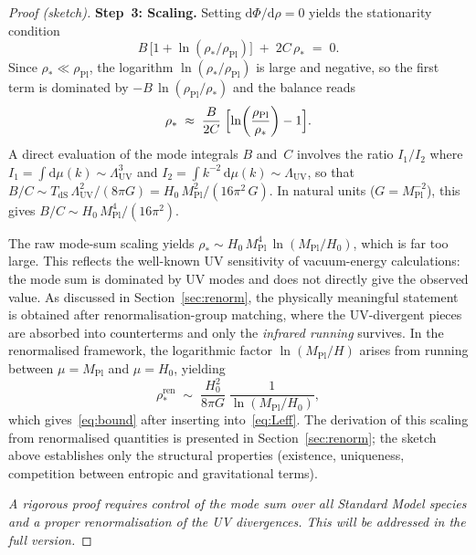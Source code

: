 \documentclass[12pt,a4paper]{article}
\theoremstyle{definition}
\theoremstyle{plain}
\theoremstyle{remark}
\newcommand{\LUV}{\Lambda_{\mathrm{UV}}}
\newcommand{\dd}{\mathrm{d}}
\begin{document}
\begin{proof}[Proof (sketch)]
\medskip\noindent
\textbf{Step~3: Scaling.}\;
Setting $\dd\Phi/\dd\rho = 0$ yields the stationarity condition
\begin{equation}\label{eq:stationarity}
  B\,\bigl[1 + \ln(\rho_{\ast}/\rho_{\mathrm{Pl}})\bigr]
  \;+\; 2C\,\rho_{\ast} \;=\; 0.
\end{equation}
Since $\rho_{\ast} \ll \rho_{\mathrm{Pl}}$, the logarithm
$\ln(\rho_{\ast}/\rho_{\mathrm{Pl}})$ is large and negative, so the
first term is dominated by $-B\,\ln(\rho_{\mathrm{Pl}}/\rho_{\ast})$
and the balance reads
\begin{equation}\label{eq:balance}
  \rho_{\ast} \;\approx\;
  \frac{B}{2C}\;\Bigl[\ln\!\left(\frac{\rho_{\mathrm{Pl}}}{\rho_{\ast}}\right)
  - 1\Bigr].
\end{equation}
A direct evaluation of the mode integrals $B$ and~$C$ involves the
ratio $I_{1}/I_{2}$ where $I_{1} = \int \dd\mu(k) \sim \LUV^{3}$ and
$I_{2} = \int k^{-2}\,\dd\mu(k) \sim \LUV$, so that
$B/C \sim T_{\mathrm{dS}}\,\LUV^{2}/(8\pi G)
= H_0\,M_{\mathrm{Pl}}^{2}/(16\pi^{2}\,G)$.
In natural units ($G = M_{\mathrm{Pl}}^{-2}$), this gives
$B/C \sim H_0\,M_{\mathrm{Pl}}^{4}/(16\pi^{2})$.

The raw mode-sum scaling yields $\rho_{\ast} \sim
H_0\,M_{\mathrm{Pl}}^{4}\,\ln(M_{\mathrm{Pl}}/H_0)$, which is far too
large.  This reflects the well-known UV sensitivity of vacuum-energy
calculations: the mode sum is dominated by UV modes and does not directly
give the observed value.  As discussed in
Section~\ref{sec:renorm}, the physically meaningful statement is obtained
after renormalisation-group matching, where the UV-divergent pieces are
absorbed into counterterms and only the \emph{infrared running} survives.
In the renormalised framework, the logarithmic factor
$\ln(M_{\mathrm{Pl}}/H)$ arises from running between $\mu = M_{\mathrm{Pl}}$
and $\mu = H_{0}$, yielding
\begin{equation}
  \rho_{\ast}^{\mathrm{ren}} \;\sim\;
  \frac{H_0^{2}}{8\pi G}\;
  \frac{1}{\ln(M_{\mathrm{Pl}}/H_0)},
\end{equation}
which gives~\eqref{eq:bound} after inserting into~\eqref{eq:Leff}.
The derivation of this scaling from renormalised quantities is
presented in Section~\ref{sec:renorm}; the sketch above establishes
only the structural properties (existence, uniqueness, competition
between entropic and gravitational terms).

\medskip\noindent
\emph{A rigorous proof requires control of the mode sum over all
Standard Model species and a proper renormalisation of the UV
divergences. This will be addressed in the full version.}
\end{proof}
\end{document}

